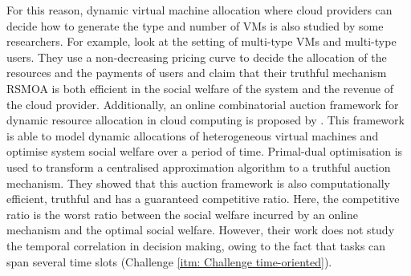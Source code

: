 \documentclass[11pt]{phdthesis}
\begin{document}
For this reason, dynamic virtual machine allocation where cloud providers can decide how to generate the type and number of VMs is also studied by some researchers. For example, \citet{shi2014rsmoa} look at the setting of multi-type VMs and multi-type users. They use a non-decreasing pricing curve to decide the allocation of the resources and the payments of users and claim that their truthful mechanism RSMOA is both efficient in the social welfare of the system and the revenue of the cloud provider. Additionally, an online combinatorial auction framework for dynamic resource allocation in cloud computing is proposed by \citet{shi2014online}. This framework is able to model dynamic allocations of heterogeneous virtual machines and optimise system social welfare over a period of time. Primal-dual optimisation is used to transform a centralised approximation algorithm to a truthful auction mechanism. They showed that this auction framework is also computationally efficient, truthful and has a guaranteed competitive ratio. Here, the competitive ratio is the worst ratio between the social welfare incurred by an online mechanism and the optimal social welfare. However, their work does not study the temporal correlation in decision making, owing to the fact that tasks can span several time slots (Challenge \ref{itm: Challenge time-oriented}). 
\end{document}
